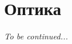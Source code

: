\documentclass[12pt]{article}
\begin{document}



    \section{Оптика}



















    \begin{center}
        \vspace{2em}
        \textit{\LARGE To be continued...}
        \vspace{2em}
    \end{center}


    \newpage
    
\end{document}
